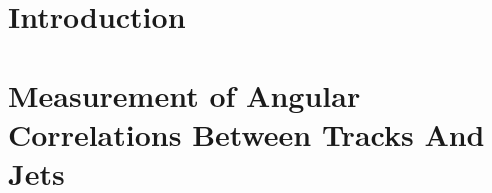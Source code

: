 \documentclass[fullpage, UKenglish]{uiucthesis2009}
\begin{document}
\chapter{Introduction}
\label{sec:theory}

\clearpage

%
%
%
%
%


\chapter{Measurement of Angular Correlations Between Tracks And Jets}
\label{sec:mainanalysis}

\clearpage

%
\end{document}
